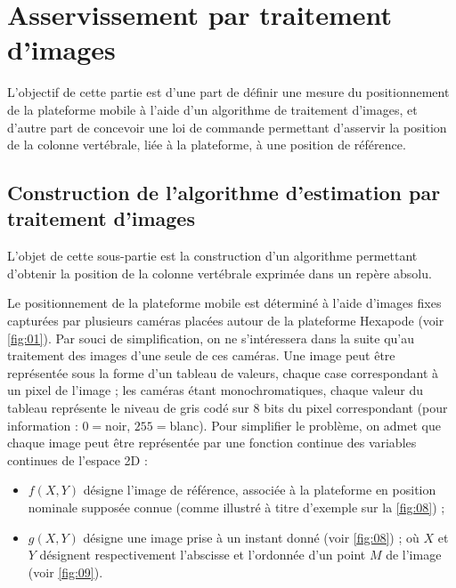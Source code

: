 \ifprof
\begin{corrige}
\end{corrige}
\else
\fi

\section{\label{sec:03} Asservissement par traitement d’images}
\begin{obj}
L’objectif de cette partie est d’une part de définir une mesure du positionnement de la plateforme
mobile à l’aide d’un algorithme de traitement d’images, et d’autre part de concevoir une loi de commande permettant d’asservir la position de la colonne vertébrale, liée à la plateforme, à une position
de référence.
\end{obj}

\subsection{Construction de l’algorithme d’estimation par traitement d’images}

\begin{obj}
L’objet de cette sous-partie est la construction d’un algorithme permettant d’obtenir la position de la
colonne vertébrale exprimée dans un repère absolu.
\end{obj}

Le positionnement de la plateforme mobile est déterminé à l’aide d’images fixes capturées par plusieurs caméras
placées autour de la plateforme Hexapode (voir \autoref{fig:01}). Par souci de simplification, on ne s’intéressera dans
la suite qu’au traitement des images d’une seule de ces caméras.
Une image peut être représentée sous la forme d’un tableau de valeurs, chaque case correspondant à un pixel de
l’image ; les caméras étant monochromatiques, chaque valeur du tableau représente le niveau de gris codé sur 8
bits du pixel correspondant (pour information : $0=$noir, $255=$blanc). Pour simplifier le problème, on admet que
chaque image peut être représentée par une fonction continue des variables continues de l’espace 2D :
\begin{itemize}
\item $f(X,Y)$ désigne l’image de référence, associée à la plateforme en position nominale supposée connue (comme
illustré à titre d’exemple sur la \autoref{fig:08}) ;
\item $g(X,Y)$ désigne une image prise à un instant donné (voir \autoref{fig:08}) ;
où $X$ et $Y$ désignent respectivement l’abscisse et l’ordonnée d’un point $M$ de l’image (voir \autoref{fig:09}).
\end{itemize}


